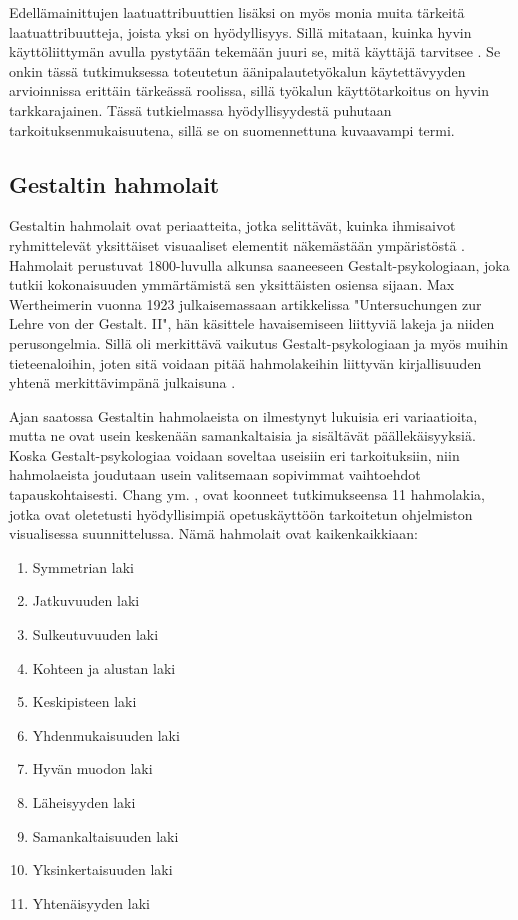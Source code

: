 \documentclass[utf8]{gradu3}
\begin{document}
Edellämainittujen laatuattribuuttien lisäksi on myös monia muita tärkeitä laatuattribuutteja, joista yksi on hyödyllisyys. Sillä mitataan, kuinka hyvin käyttöliittymän avulla pystytään tekemään juuri se, mitä käyttäjä tarvitsee \parencite[][]{intro-usability}. Se onkin tässä tutkimuksessa toteutetun äänipalautetyökalun käytettävyyden arvioinnissa erittäin tärkeässä roolissa, sillä työkalun käyttötarkoitus on hyvin tarkkarajainen. Tässä tutkielmassa hyödyllisyydestä puhutaan tarkoituksenmukaisuutena, sillä se on suomennettuna kuvaavampi termi.


\subsection{Gestaltin hahmolait}

Gestaltin hahmolait ovat periaatteita, jotka selittävät, kuinka ihmisaivot ryhmittelevät yksittäiset visuaaliset elementit näkemästään ympäristöstä \parencite[][]{koffka}. Hahmolait perustuvat 1800-luvulla alkunsa saaneeseen Gestalt-psykologiaan, joka tutkii kokonaisuuden ymmärtämistä sen yksittäisten osiensa sijaan. Max Wertheimerin vuonna 1923 julkaisemassaan artikkelissa "Untersuchungen zur Lehre von der Gestalt. II", hän käsittele havaisemiseen liittyviä lakeja ja niiden perusongelmia. Sillä oli merkittävä vaikutus Gestalt-psykologiaan ja myös muihin tieteenaloihin, joten sitä voidaan pitää hahmolakeihin liittyvän kirjallisuuden yhtenä merkittävimpänä julkaisuna \parencite[][]{rearranged}. 

Ajan saatossa Gestaltin hahmolaeista on ilmestynyt lukuisia eri variaatioita, mutta ne ovat usein keskenään samankaltaisia ja sisältävät päällekäisyyksiä. Koska Gestalt-psykologiaa voidaan soveltaa useisiin eri tarkoituksiin, niin hahmolaeista joudutaan usein valitsemaan sopivimmat vaihtoehdot tapauskohtaisesti. Chang ym. \parencite[][]{chang}, ovat koonneet tutkimukseensa 11 hahmolakia, jotka ovat oletetusti hyödyllisimpiä opetuskäyttöön tarkoitetun ohjelmiston visualisessa suunnittelussa. Nämä hahmolait ovat kaikenkaikkiaan:

\begin{enumerate}
  \item Symmetrian laki
  \item Jatkuvuuden laki
  \item Sulkeutuvuuden laki
  \item Kohteen ja alustan laki
  \item Keskipisteen laki
  \item Yhdenmukaisuuden laki
  \item Hyvän muodon laki
  \item Läheisyyden laki
  \item Samankaltaisuuden laki
  \item Yksinkertaisuuden laki
  \item Yhtenäisyyden laki
\end{enumerate}
\end{document}
